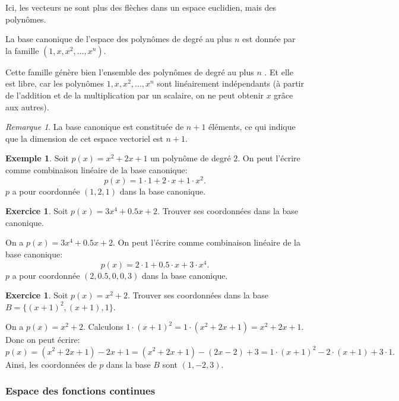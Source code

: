 \documentclass[11pt,a4paper]{article}
\numberwithin{equation}{section}
\theoremstyle{plain}
\theoremstyle{definition}
\newtheorem{example}[theorem]{Exemple}
\newtheorem{exercise}[theorem]{Exercice}
\theoremstyle{remark}
\newtheorem*{remark}{Remarque}
\begin{document}
Ici, les vecteurs ne sont plus des flèches dans un espace euclidien, mais des polynômes.

La base canonique de l'espace des polynômes de degré au plus \(n\) est donnée par la famille \((1, x, x^2, \ldots, x^n)\).

Cette famille génère bien l'ensemble des polynômes de degré au plus \(n\) . Et elle est libre, car les polynômes \(1, x, x^2, \ldots, x^n\) sont linéairement indépendants (à partir de l'addition et de la multiplication par un scalaire, on ne peut obtenir $x$ grâce aux autres).

\begin{remark}
    La base canonique est constituée de $n+1$ éléments, ce qui indique que la dimension de cet espace vectoriel est $n+1$.
\end{remark}

\begin{example}
    Soit $p(x) = x^2 + 2x + 1$ un polynôme de degré 2. On peut l'écrire comme combinaison linéaire de la base canonique:
    \[
        p(x) = 1 \cdot 1 + 2 \cdot x + 1 \cdot x^2.
    \]
    $p$ a pour coordonnée $(1, 2, 1)$ dans la base canonique.
\end{example}

\begin{exercise}
    Soit $p(x) = 3x^4 + 0.5 x +2$. Trouver ses coordonnées dans la base canonique.
\end{exercise}

\begin{solution}
On a $p(x) = 3x^4 + 0.5 x +2$. On peut l'écrire comme combinaison linéaire de la base canonique:
\[
    p(x) = 2 \cdot 1 + 0.5 \cdot x + 3 \cdot x^4.
\]
$p$ a pour coordonnée $(2, 0.5, 0, 0, 3)$ dans la base canonique.
\end{solution}

\begin{exercise}
    Soit $p(x) = x^2 + 2$. Trouver ses coordonnées dans la base $B = \{(x+1)^2, (x+1), 1\}$.
\end{exercise}
\begin{solution}
    On a $p(x) = x^2 + 2$.
    Calculons $1 \cdot (x+1)^2 = 1 \cdot (x^2 + 2x + 1) = x^2 + 2x + 1$.
    Donc on peut écrire:
    \[
        p(x) = (x^2 + 2x + 1) - 2x + 1 = (x^2 + 2x + 1) - (2x - 2) + 3 = 1 \cdot (x+1)^2 - 2 \cdot (x+1) + 3 \cdot 1.
    \]
    Ainsi, les coordonnées de $p$ dans la base $B$ sont $(1, -2, 3)$.
\end{solution}

\subsubsection{Espace des fonctions continues}
\end{document}
